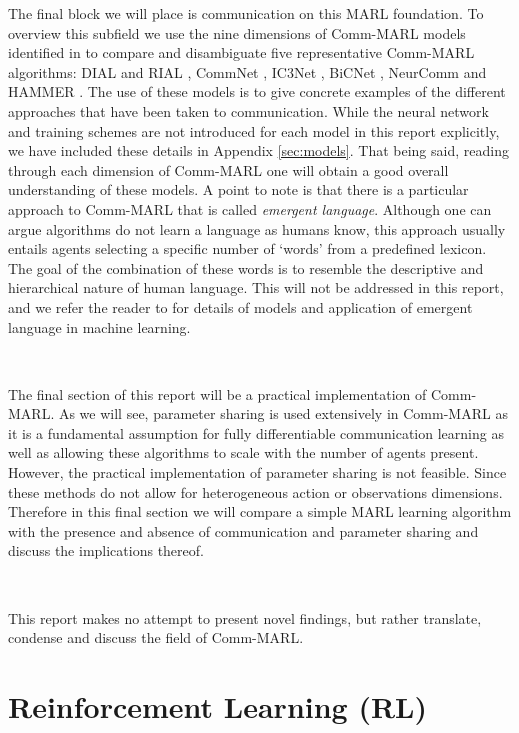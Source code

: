 \documentclass{article}
\begin{document}
The final block we will place is communication on this MARL foundation. To overview this subfield we use the nine dimensions of Comm-MARL models identified in \citet{zhu2024survey} to compare and disambiguate five representative Comm-MARL algorithms: DIAL and RIAL \citep{foerster2016learning}, CommNet \citep{sukhbaatar2016commnet}, IC3Net \citep{singh2018ic3net}, BiCNet \citep{peng2017bicnet}, NeurComm \citep{chu2020NeurComm} and HAMMER \citep{gupta2022HAMMER}. The use of these models is to give concrete examples of the different approaches that have been taken to communication. While the neural network and training schemes are not introduced for each model in this report explicitly, we have included these details in Appendix \ref{sec:models}. That being said, reading through each dimension of Comm-MARL one will obtain a good overall understanding of these models. A point to note is that there is a particular approach to Comm-MARL that is called \textit{emergent language}. Although one can argue algorithms do not learn a language as humans know, this approach usually entails agents selecting a specific number of `words' from a predefined lexicon. The goal of the combination of these words is to resemble the descriptive and hierarchical nature of human language. This will not be addressed in this report, and we refer the reader to \citet{boldt2024review} for details of models and application of emergent language in machine learning.

\

The final section of this report will be a practical implementation of Comm-MARL. As we will see, parameter sharing is used extensively in Comm-MARL as it is a fundamental assumption for fully differentiable communication learning as well as allowing these algorithms to scale with the number of agents present. However, the practical implementation of parameter sharing is not feasible. \citep{terry2023revisiting} Since these methods do not allow for heterogeneous action or observations dimensions. Therefore in this final section we will compare a simple MARL learning algorithm with the presence and absence of communication and parameter sharing and discuss the implications thereof.

\

This report makes no attempt to present novel findings, but rather translate, condense and discuss the field of Comm-MARL. 

\newpage

\section{Reinforcement Learning (RL)} \label{sec:rl}
\end{document}
